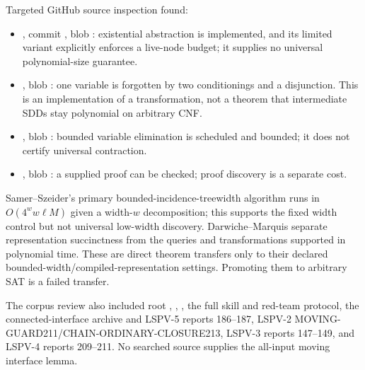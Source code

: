 \documentclass[11pt]{article}
\begin{document}
Targeted GitHub source inspection found:
\begin{itemize}
\item {}, commit
, blob
: existential abstraction is implemented, and its limited
variant explicitly enforces a live-node budget; it supplies no universal
polynomial-size guarantee.
\item {},
blob : one variable is forgotten by two conditionings and a
disjunction. This is an implementation of a transformation, not a theorem
that intermediate SDDs stay polynomial on arbitrary CNF.
\item {}, blob
: bounded variable elimination is scheduled and bounded;
it does not certify universal contraction.
\item {}, blob
: a supplied proof can be checked; proof discovery is a
separate cost.
\end{itemize}
Samer--Szeider's primary bounded-incidence-treewidth algorithm runs in
$O(4^w w\ell M)$ given a width-$w$ decomposition; this supports the fixed
width control but not universal low-width discovery. Darwiche--Marquis
separate representation succinctness from the queries and transformations
supported in polynomial time. These are direct theorem transfers only to
their declared bounded-width/compiled-representation settings. Promoting
them to arbitrary SAT is a failed transfer.

The corpus review also included root , ,
, the full  skill and red-team protocol,
the connected-interface archive and LSPV-5 reports 186--187, LSPV-2
MOVING-GUARD211/CHAIN-ORDINARY-CLOSURE213, LSPV-3 reports 147--149, and
LSPV-4 reports 209--211. No searched source supplies the all-input moving
interface lemma.
\end{document}
